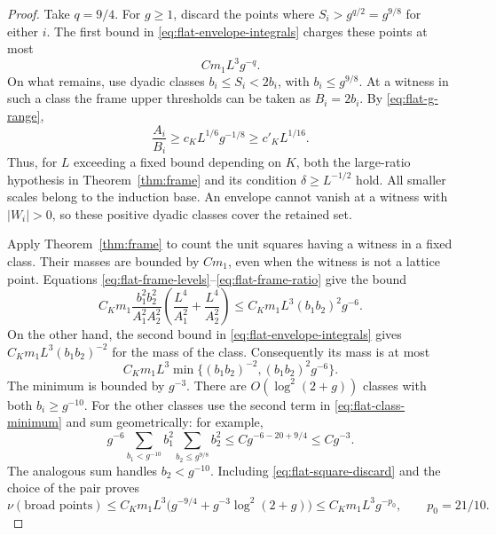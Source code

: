 \begin{proof}
Take $q=9/4$.  For $g\geq1$, discard the points where
$S_i>g^{q/2}=g^{9/8}$ for either $i$.  The first bound in
\eqref{eq:flat-envelope-integrals} charges these points at most
\begin{equation}\label{eq:flat-square-discard}
 C m_1L^3g^{-q}.
\end{equation}
On what remains, use dyadic classes
$b_i\leq S_i<2b_i$, with $b_i\leq g^{9/8}$.
At a witness in such a class the frame upper thresholds can be taken
as $B_i=2b_i$.  By \eqref{eq:flat-g-range},
\begin{equation}\label{eq:flat-frame-ratio}
 \frac{A_i}{B_i}
    \geq c_K L^{1/6}g^{-1/8}
    \geq c'_K L^{1/16}.
\end{equation}
Thus, for $L$ exceeding a fixed bound depending on $K$, both the
large-ratio hypothesis in Theorem~\ref{thm:frame} and its condition
$\delta\geq L^{-1/2}$ hold.  All smaller scales belong to the
induction base.  An envelope cannot vanish at a witness with
$|W_i|>0$, so these positive dyadic classes cover the retained set.

Apply Theorem~\ref{thm:frame} to count the unit squares having a
witness in a fixed class.  Their masses are bounded by $C m_1$, even
when the witness is not a lattice point.  Equations
\eqref{eq:flat-frame-levels}--\eqref{eq:flat-frame-ratio} give the bound
\[
 C_Km_1\frac{b_1^2b_2^2}{A_1^2A_2^2}
       \left(\frac{L^4}{A_1^2}+\frac{L^4}{A_2^2}\right)
   \leq C_Km_1L^3(b_1b_2)^2g^{-6}.
\]
On the other hand, the second bound in
\eqref{eq:flat-envelope-integrals} gives
$C_Km_1L^3(b_1b_2)^{-2}$ for the mass of the class.  Consequently its
mass is at most
\begin{equation}\label{eq:flat-class-minimum}
 C_Km_1L^3\min\bigl\{(b_1b_2)^{-2},
                              (b_1b_2)^2g^{-6}\bigr\}.
\end{equation}
The minimum is bounded by $g^{-3}$.  There are
$O(\log^2(2+g))$ classes with both $b_i\geq g^{-10}$.
For the other classes use the second term in
\eqref{eq:flat-class-minimum} and sum geometrically: for example,
\[
 g^{-6}\sum_{b_1<g^{-10}}b_1^2
                 \sum_{b_2\leq g^{9/8}}b_2^2
       \leq C g^{-6-20+9/4}\leq C g^{-3}.
\]
The analogous sum handles $b_2<g^{-10}$.  Including
\eqref{eq:flat-square-discard} and the choice of the pair proves
\begin{equation}\label{eq:flat-broad-bound}
 \nu(\text{broad points})
   \leq C_Km_1L^3
       \bigl(g^{-9/4}+g^{-3}\log^2(2+g)\bigr)
   \leq C_Km_1L^3g^{-p_0},
 \qquad p_0=21/10.
\end{equation}


\end{proof}
